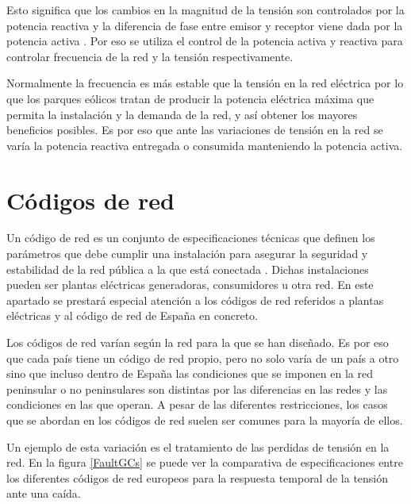 \documentclass{book}
\begin{document}
Esto significa que los cambios en la magnitud de la tensi\'on son controlados por la potencia reactiva y la  diferencia de fase entre emisor y receptor viene dada por la potencia activa \cite{WFgridcode}. Por eso se utiliza el control de la potencia activa y reactiva para controlar frecuencia de la red y la tensi\'on respectivamente. \par

Normalmente la frecuencia es m\'as estable que la tensi\'on en la red el\'ectrica por lo que los parques e\'olicos tratan de producir la potencia el\'ectrica m\'axima que permita la instalaci\'on y la demanda de la red, y as\'i obtener los mayores beneficios posibles. Es por eso que ante las variaciones de tensi\'on en la red se var\'ia la potencia reactiva entregada o consumida manteniendo la potencia activa. \par


	\section{C\'odigos de red}

Un c\'odigo de red es un conjunto de especificaciones t\'ecnicas que definen los par\'ametros que debe cumplir una instalaci\'on para asegurar la seguridad y estabilidad de la red p\'ublica a la que est\'a conectada  \cite{UKgridCode}. Dichas instalaciones pueden ser plantas el\'ectricas generadoras, consumidores u otra red. En este apartado se prestar\'a especial atenci\'on a los c\'odigos de red referidos a plantas el\'ectricas y al c\'odigo de red de España en concreto. \par

Los c\'odigos de red var\'ian seg\'un la red para la que se han diseñado. Es por eso que cada pa\'is tiene un c\'odigo de red propio, pero no solo var\'ia de un pa\'is a otro sino que incluso dentro de España las condiciones que se imponen en la red peninsular o no peninsulares son distintas por las diferencias en las redes y las condiciones en las que operan. A pesar de las diferentes restricciones, los casos que se abordan en los c\'odigos de red suelen ser comunes para la mayor\'ia de ellos.  \par

Un ejemplo de esta variaci\'on es el tratamiento de las perdidas de tensi\'on en la red. En la figura \ref{FaultGCs} se puede ver la comparativa de especificaciones entre los diferentes c\'odigos de red europeos para la respuesta temporal de la tensi\'on ante una ca\'ida. \par
\end{document}
